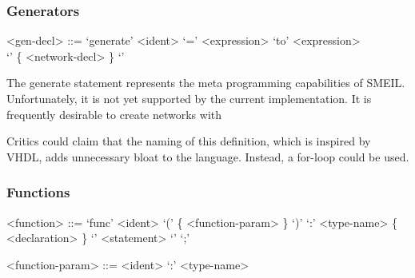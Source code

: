 \subsubsection{Generators}
\begin{grammar}
  <gen-decl> ::= `generate' <ident> `=' <expression> `to' <expression> \\ `{' \{ <network-decl> \} `}'
\end{grammar}
The {\ttfamily generate} statement represents the meta programming capabilities
of SMEIL. Unfortunately, it is not yet supported by the current
implementation. It is frequently desirable to create networks with 

Critics could claim that the naming of this definition, which is inspired by
VHDL, adds unnecessary bloat to the language. Instead, a {\ttfamily for}-loop
could be used.  

\subsubsection{Functions}
\begin{grammar}
  <function> ::= `func' <ident> `(' \{ <function-param> \} `)' `:' <type-name>
  \{ <declaration> \} `{' { <statement> } `}' `;'

  <function-param> ::= <ident> `:' <type-name>
\end{grammar}



